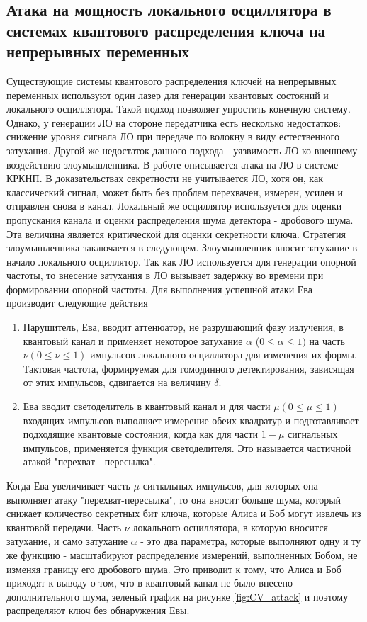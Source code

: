 \subsection{Атака на мощность локального осциллятора в системах квантового распределения ключа на непрерывных переменных}\label{sec:ch1/sect7/subsec2}
Существующие системы квантового распределения ключей на непрерывных переменных используют один лазер для генерации квантовых состояний и локального осциллятора. Такой подход позволяет упростить конечную систему. 
Однако, у генерации ЛО на стороне передатчика есть несколько недостатков: снижение уровня сигнала ЛО при передаче по волокну в виду естественного затухания. Другой же недостаток данного подхода - уязвимость ЛО ко внешнему воздействию злоумышленника.
В работе \cite{jouguet2013, fan2023} описывается атака на ЛО в системе КРКНП. В доказательствах секретности не учитывается ЛО, хотя он, как классический сигнал, может быть без проблем перехвачен, измерен, усилен и отправлен снова в канал.
Локальный же осциллятор используется для оценки пропускания канала и оценки распределения шума детектора - дробового шума. Эта величина является критической для оценки секретности ключа. 
Стратегия злоумышленника заключается в следующем. Злоумышленник вносит затухание в начало локального осциллятор. Так как ЛО используется для генерации опорной частоты, то внесение затухания в ЛО вызывает задержку во времени при формировании опорной частоты.
Для выполнения успешной атаки Ева производит следующие действия
\begin{enumerate}
    \item Нарушитель, Ева, вводит аттенюатор, не разрушающий фазу излучения, в квантовый канал и применяет некоторое затухание $\alpha$ ($0\leq \alpha \leq 1)$ на часть $\nu (0 \leq \nu \leq 1)$ импульсов локального осциллятора для изменения их формы. Тактовая частота, формируемая для гомодинного детектирования, зависящая от этих импульсов, сдвигается на величину $\delta$.
    \item Ева вводит светоделитель в квантовый канал и для части $\mu (0 \leq \mu \leq 1)$ входящих импульсов выполняет измерение обеих квадратур и подготавливает подходящие квантовые состояния, когда как для части $1 -\mu$ сигнальных импульсов, применяется функция светоделителя. Это называется частичной атакой "перехват - пересылка". 
\end{enumerate} 
Когда Ева увеличивает часть $\mu$ сигнальных импульсов, для которых она выполняет атаку "перехват-пересылка", то она вносит больше шума, который снижает количество секретных бит ключа, которые Алиса и Боб могут извлечь из квантовой передачи.
Часть $\nu$ локального осциллятора, в которую вносится затухание, и само затухание $\alpha$ - это два параметра, которые выполняют одну и ту же функцию - масштабируют распределение измерений, выполненных Бобом, не изменяя границу его дробового шума. Это приводит к тому, что Алиса и Боб приходят к выводу о том, что в квантовый канал не было внесено дополнительного шума, зеленый график на рисунке \ref*{fig:CV_attack} и поэтому распределяют ключ без обнаружения Евы.

